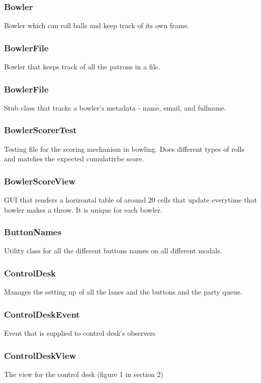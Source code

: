 \subsubsection{Bowler}
Bowler which can roll balls and keep track of its own frame.

\subsubsection{BowlerFile}
Bowler that keeps track of all the patrons in a file.

\subsubsection{BowlerFile}
Stub class that tracks a bowler's metadata - name, email, and fullname.

\subsubsection{BowlerScorerTest}
Testing file for the scoring mechanism in bowling. Does different types of rolls and matches the expected cumulativbe score.

\subsubsection{BowlerScoreView}
GUI that renders a horizontal table of around 20 cells that update everytime that bowler makes a throw. It is unique for each bowler.

\subsubsection{ButtonNames}
Utility class for all the different buttons names on all different modals.

\subsubsection{ControlDesk}
Manages the setting up of all the lanes and the buttons and the party queue.

\subsubsection{ControlDeskEvent}
Event that is supplied to control desk's observers

\subsubsection{ControlDeskView}
The view for the control desk (figure 1 in section 2)

